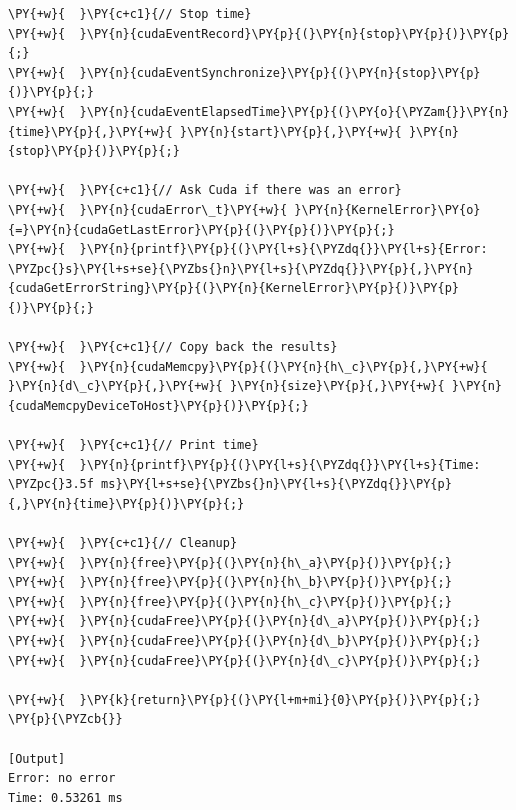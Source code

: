 \begin{Verbatim}[label=\makebox{\url{https://github.com/lucabaldini/cmepda/tree/master/slides/latex/snippets/cuda_vec_add_complete.cu}},commandchars=\\\{\}]
\PY{+w}{  }\PY{c+c1}{// Stop time}
\PY{+w}{  }\PY{n}{cudaEventRecord}\PY{p}{(}\PY{n}{stop}\PY{p}{)}\PY{p}{;}
\PY{+w}{  }\PY{n}{cudaEventSynchronize}\PY{p}{(}\PY{n}{stop}\PY{p}{)}\PY{p}{;}
\PY{+w}{  }\PY{n}{cudaEventElapsedTime}\PY{p}{(}\PY{o}{\PYZam{}}\PY{n}{time}\PY{p}{,}\PY{+w}{ }\PY{n}{start}\PY{p}{,}\PY{+w}{ }\PY{n}{stop}\PY{p}{)}\PY{p}{;}

\PY{+w}{  }\PY{c+c1}{// Ask Cuda if there was an error}
\PY{+w}{  }\PY{n}{cudaError\_t}\PY{+w}{ }\PY{n}{KernelError}\PY{o}{=}\PY{n}{cudaGetLastError}\PY{p}{(}\PY{p}{)}\PY{p}{;}
\PY{+w}{  }\PY{n}{printf}\PY{p}{(}\PY{l+s}{\PYZdq{}}\PY{l+s}{Error: \PYZpc{}s}\PY{l+s+se}{\PYZbs{}n}\PY{l+s}{\PYZdq{}}\PY{p}{,}\PY{n}{cudaGetErrorString}\PY{p}{(}\PY{n}{KernelError}\PY{p}{)}\PY{p}{)}\PY{p}{;}

\PY{+w}{  }\PY{c+c1}{// Copy back the results}
\PY{+w}{  }\PY{n}{cudaMemcpy}\PY{p}{(}\PY{n}{h\_c}\PY{p}{,}\PY{+w}{ }\PY{n}{d\_c}\PY{p}{,}\PY{+w}{ }\PY{n}{size}\PY{p}{,}\PY{+w}{ }\PY{n}{cudaMemcpyDeviceToHost}\PY{p}{)}\PY{p}{;}

\PY{+w}{  }\PY{c+c1}{// Print time}
\PY{+w}{  }\PY{n}{printf}\PY{p}{(}\PY{l+s}{\PYZdq{}}\PY{l+s}{Time: \PYZpc{}3.5f ms}\PY{l+s+se}{\PYZbs{}n}\PY{l+s}{\PYZdq{}}\PY{p}{,}\PY{n}{time}\PY{p}{)}\PY{p}{;}

\PY{+w}{  }\PY{c+c1}{// Cleanup}
\PY{+w}{  }\PY{n}{free}\PY{p}{(}\PY{n}{h\_a}\PY{p}{)}\PY{p}{;}
\PY{+w}{  }\PY{n}{free}\PY{p}{(}\PY{n}{h\_b}\PY{p}{)}\PY{p}{;}
\PY{+w}{  }\PY{n}{free}\PY{p}{(}\PY{n}{h\_c}\PY{p}{)}\PY{p}{;}
\PY{+w}{  }\PY{n}{cudaFree}\PY{p}{(}\PY{n}{d\_a}\PY{p}{)}\PY{p}{;}
\PY{+w}{  }\PY{n}{cudaFree}\PY{p}{(}\PY{n}{d\_b}\PY{p}{)}\PY{p}{;}
\PY{+w}{  }\PY{n}{cudaFree}\PY{p}{(}\PY{n}{d\_c}\PY{p}{)}\PY{p}{;}

\PY{+w}{  }\PY{k}{return}\PY{p}{(}\PY{l+m+mi}{0}\PY{p}{)}\PY{p}{;}
\PY{p}{\PYZcb{}}

[Output]
Error: no error
Time: 0.53261 ms
\end{Verbatim}